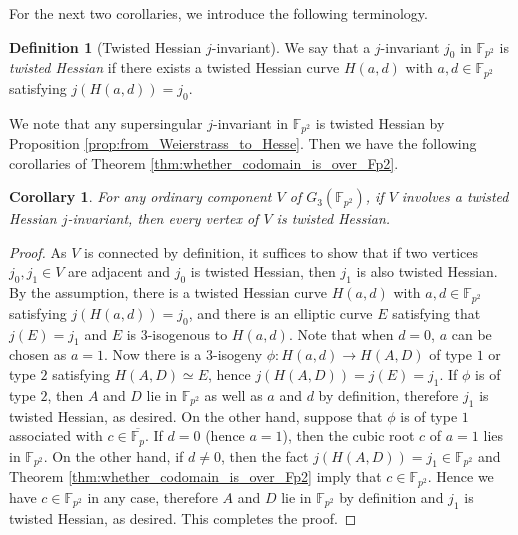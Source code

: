 \documentclass{article}
\newtheorem{corollary}[theorem]{Corollary}
\theoremstyle{definition}
\newtheorem{definition}[theorem]{Definition}
\newcommand{\FF}{\mathbb{F}}
\begin{document}
For the next two corollaries, we introduce the following terminology.

\begin{definition}
[Twisted Hessian $j$-invariant]
\label{defn:twisted_Hessian_j-invariant}
We say that a $j$-invariant $j_0$ in $\FF_{p^2}$ is \emph{twisted Hessian} if there exists a twisted Hessian curve $H(a,d)$ with $a,d \in \FF_{p^2}$ satisfying $j(H(a,d)) = j_0$.
\end{definition}

We note that any supersingular $j$-invariant in $\FF_{p^2}$ is twisted Hessian by Proposition \ref{prop:from_Weierstrass_to_Hesse}.
Then we have the following corollaries of Theorem \ref{thm:whether_codomain_is_over_Fp2}.

\begin{corollary}
\label{cor:twisted_Hessian_component}
For any ordinary component $V$ of $G_3(\FF_{p^2})$, if $V$ involves a twisted Hessian $j$-invariant, then every vertex of $V$ is twisted Hessian.
\end{corollary}
\begin{proof}
As $V$ is connected by definition, it suffices to show that if two vertices $j_0,j_1 \in V$ are adjacent and $j_0$ is twisted Hessian, then $j_1$ is also twisted Hessian.
By the assumption, there is a twisted Hessian curve $H(a,d)$ with $a,d \in \FF_{p^2}$ satisfying $j(H(a,d)) = j_0$, and there is an elliptic curve $E$ satisfying that $j(E) = j_1$ and $E$ is $3$-isogenous to $H(a,d)$.
Note that when $d = 0$, $a$ can be chosen as $a = 1$.
Now there is a $3$-isogeny $\phi \colon H(a,d) \to H(A,D)$ of type $1$ or type $2$ satisfying $H(A,D) \simeq E$, hence $j(H(A,D)) = j(E) = j_1$.
If $\phi$ is of type $2$, then $A$ and $D$ lie in $\FF_{p^2}$ as well as $a$ and $d$ by definition, therefore $j_1$ is twisted Hessian, as desired.
On the other hand, suppose that $\phi$ is of type $1$ associated with $c \in \overline{\FF_p}$.
If $d = 0$ (hence $a = 1$), then the cubic root $c$ of $a = 1$ lies in $\FF_{p^2}$.
On the other hand, if $d \neq 0$, then the fact $j(H(A,D)) = j_1 \in \FF_{p^2}$ and Theorem \ref{thm:whether_codomain_is_over_Fp2} imply that $c \in \FF_{p^2}$.
Hence we have $c \in \FF_{p^2}$ in any case, therefore $A$ and $D$ lie in $\FF_{p^2}$ by definition and $j_1$ is twisted Hessian, as desired.
This completes the proof.
\end{proof}
\end{document}
